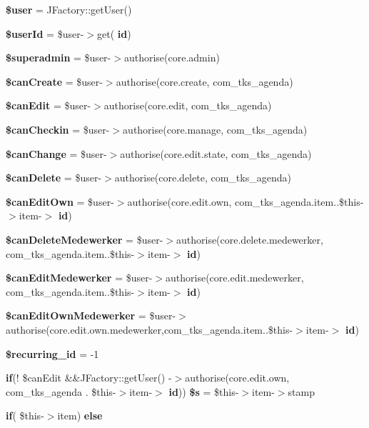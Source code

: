\begin{DoxyCompactItemize}
\item 
\textbf{ \$user} = J\+Factory\+::get\+User()
\item 
\textbf{ \$user\+Id} = \$user-\/$>$get(\textquotesingle{}\textbf{ id}\textquotesingle{})
\item 
\textbf{ \$superadmin} = \$user-\/$>$authorise(\textquotesingle{}core.\+admin\textquotesingle{})
\item 
\textbf{ \$can\+Create} = \$user-\/$>$authorise(\textquotesingle{}core.\+create\textquotesingle{}, \textquotesingle{}com\+\_\+tks\+\_\+agenda\textquotesingle{})
\item 
\textbf{ \$can\+Edit} = \$user-\/$>$authorise(\textquotesingle{}core.\+edit\textquotesingle{}, \textquotesingle{}com\+\_\+tks\+\_\+agenda\textquotesingle{})
\item 
\textbf{ \$can\+Checkin} = \$user-\/$>$authorise(\textquotesingle{}core.\+manage\textquotesingle{}, \textquotesingle{}com\+\_\+tks\+\_\+agenda\textquotesingle{})
\item 
\textbf{ \$can\+Change} = \$user-\/$>$authorise(\textquotesingle{}core.\+edit.\+state\textquotesingle{}, \textquotesingle{}com\+\_\+tks\+\_\+agenda\textquotesingle{})
\item 
\textbf{ \$can\+Delete} = \$user-\/$>$authorise(\textquotesingle{}core.\+delete\textquotesingle{}, \textquotesingle{}com\+\_\+tks\+\_\+agenda\textquotesingle{})
\item 
\textbf{ \$can\+Edit\+Own} = \$user-\/$>$authorise(\textquotesingle{}core.\+edit.\+own\textquotesingle{}, \textquotesingle{}com\+\_\+tks\+\_\+agenda.\+item.\textquotesingle{}.\$this-\/$>$item-\/$>$\textbf{ id})
\item 
\textbf{ \$can\+Delete\+Medewerker} = \$user-\/$>$authorise(\textquotesingle{}core.\+delete.\+medewerker\textquotesingle{}, \textquotesingle{}com\+\_\+tks\+\_\+agenda.\+item.\textquotesingle{}.\$this-\/$>$item-\/$>$\textbf{ id})
\item 
\textbf{ \$can\+Edit\+Medewerker} = \$user-\/$>$authorise(\textquotesingle{}core.\+edit.\+medewerker\textquotesingle{}, \textquotesingle{}com\+\_\+tks\+\_\+agenda.\+item.\textquotesingle{}.\$this-\/$>$item-\/$>$\textbf{ id})
\item 
\textbf{ \$can\+Edit\+Own\+Medewerker} = \$user-\/$>$authorise(\textquotesingle{}core.\+edit.\+own.\+medewerker\textquotesingle{},\textquotesingle{}com\+\_\+tks\+\_\+agenda.\+item.\textquotesingle{}.\$this-\/$>$item-\/$>$\textbf{ id})
\item 
\textbf{ \$recurring\+\_\+id} = -\/1
\item 
\textbf{ if}(! \$can\+Edit \&\&J\+Factory\+::get\+User() -\/$>$authorise(\textquotesingle{}core.\+edit.\+own\textquotesingle{}, \textquotesingle{}com\+\_\+tks\+\_\+agenda\textquotesingle{} . \$this-\/$>$item-\/$>$\textbf{ id})) \textbf{ \$s} = \$this-\/$>$item-\/$>$stamp
\item 
\textbf{ if}( \$this-\/$>$item) \textbf{ else}
\end{DoxyCompactItemize}


